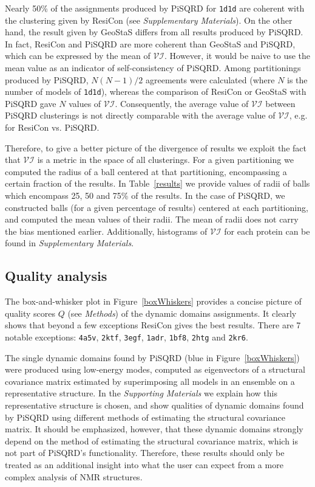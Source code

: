 Nearly 50\% of the assignments produced by PiSQRD for \texttt{1d1d} are coherent with the clustering given by ResiCon (see \emph{Supplementary Materials}).
On the other hand, the result given by GeoStaS differs from all results produced by PiSQRD.
In fact, ResiCon and PiSQRD are more coherent than GeoStaS and PiSQRD, which can be expressed by the mean of $\mathcal{VI}$.
However, it would be naive to use the mean value as an indicator of self-consistency of PiSQRD.
Among partitionings produced by PiSQRD, $N(N-1)/2$ agreements were calculated (where $N$ is the number of models of \texttt{1d1d}), whereas the comparison of ResiCon or GeoStaS with PiSQRD gave $N$ values of $\mathcal{VI}$.
Consequently, the average value of $\mathcal{VI}$ between PiSQRD clusterings is not directly comparable with the average value of $\mathcal{VI}$, e.g. for ResiCon vs. PiSQRD.

Therefore, to give a better picture of the divergence of results we exploit the fact that $\mathcal{VI}$ is a metric in the space of all clusterings.
For a given partitioning we computed the radius of a ball %
 centered at that partitioning, encompassing a certain fraction of the results.
In Table~\ref{results} we provide values of radii of balls which encompass 25, 50 and 75\% of the results.
In the case of PiSQRD, we constructed balls (for a given percentage of results) centered at each partitioning, and computed the mean values of their radii.
The mean of radii does not carry the bias mentioned earlier.
Additionally, histograms of $\mathcal{VI}$ for each protein can be found in \emph{Supplementary Materials}.

\subsection*{Quality analysis}

The box-and-whisker plot in Figure~\ref{boxWhiskers} provides a concise picture of quality scores $Q$ (see \emph{Methods}) of the dynamic domains assignments.
It clearly shows that beyond a few exceptions ResiCon gives the best results.
There are 7 notable exceptions: \texttt{4a5v}, \texttt{2ktf}, \texttt{3egf}, \texttt{1adr}, \texttt{1bf8}, \texttt{2htg} and \texttt{2kr6}.

The single dynamic domains found by PiSQRD (blue in Figure~\ref{boxWhiskers}) were produced using low-energy modes, computed as eigenvectors of a structural covariance matrix estimated by superimposing all models in an ensemble on a representative structure.
In the \emph{Supporting Materials} we explain how this representative structure is chosen, and show qualities of dynamic domains found by PiSQRD using different methods of estimating the structural covariance matrix.
It should be emphasized, however, that these dynamic domains strongly depend on the method of estimating the structural covariance matrix, which is not part of PiSQRD's functionality.
Therefore, these results should only be treated as an additional insight into what the user can expect from a more complex analysis of NMR structures.

